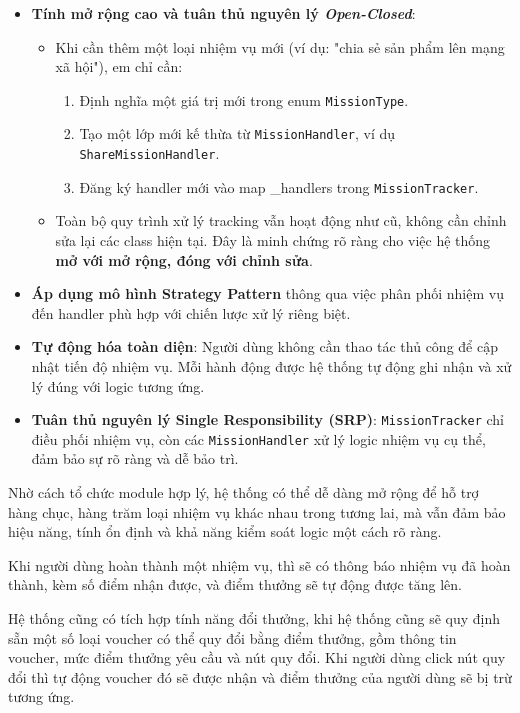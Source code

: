 \documentclass[../DoAn.tex]{subfiles}
\begin{document}
\begin{itemize}
    
    \item \textbf{Tính mở rộng cao và tuân thủ nguyên lý \textit{Open-Closed}}:
    \begin{itemize}
        \item Khi cần thêm một loại nhiệm vụ mới (ví dụ: "chia sẻ sản phẩm lên mạng xã hội"), em chỉ cần:
        \begin{enumerate}
            \item Định nghĩa một giá trị mới trong enum \texttt{MissionType}.
            \item Tạo một lớp mới kế thừa từ \texttt{MissionHandler}, ví dụ \texttt{ShareMissionHandler}.
            \item Đăng ký handler mới vào map \_handlers trong \texttt{MissionTracker}.
        \end{enumerate}
        \item Toàn bộ quy trình xử lý tracking vẫn hoạt động như cũ, không cần chỉnh sửa lại các class hiện tại. Đây là minh chứng rõ ràng cho việc hệ thống \textbf{mở với mở rộng, đóng với chỉnh sửa}.
    \end{itemize}
    
    \item \textbf{Áp dụng mô hình Strategy Pattern} thông qua việc phân phối nhiệm vụ đến handler phù hợp với chiến lược xử lý riêng biệt.
    
    \item \textbf{Tự động hóa toàn diện}: Người dùng không cần thao tác thủ công để cập nhật tiến độ nhiệm vụ. Mỗi hành động được hệ thống tự động ghi nhận và xử lý đúng với logic tương ứng.
    
    \item \textbf{Tuân thủ nguyên lý Single Responsibility (SRP)}: \texttt{MissionTracker} chỉ điều phối nhiệm vụ, còn các \texttt{MissionHandler} xử lý logic nhiệm vụ cụ thể, đảm bảo sự rõ ràng và dễ bảo trì.
\end{itemize}

Nhờ cách tổ chức module hợp lý, hệ thống có thể dễ dàng mở rộng để hỗ trợ hàng chục, hàng trăm loại nhiệm vụ khác nhau trong tương lai, mà vẫn đảm bảo hiệu năng, tính ổn định và khả năng kiểm soát logic một cách rõ ràng.

Khi người dùng hoàn thành một nhiệm vụ, thì sẽ có thông báo nhiệm vụ đã hoàn thành, kèm số điểm nhận được, và điểm thưởng sẽ tự động được tăng lên. 

Hệ thống cũng có tích hợp tính năng đổi thưởng, khi hệ thống cũng sẽ quy định sẵn một số loại voucher có thể quy đổi bằng điểm thưởng, gồm thông tin voucher, mức điểm thưởng yêu cầu và nút quy đổi. Khi người dùng click nút quy đổi thì tự động voucher đó sẽ được nhận và điểm thưởng của người dùng sẽ bị trừ tương ứng.
\end{document}
